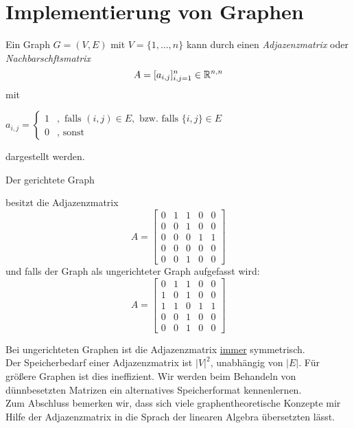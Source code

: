 \section{Implementierung von Graphen}
\begin{definition}
Ein Graph $G=(V,E)$ mit $V=\{1,\ldots,n\}$ kann durch einen \emph{Adjazenzmatrix} oder \emph{Nachbarschftsmatrix}
\[
A = [a_{i,j} ]_{i,j=1}^{n} \in  \mathbb{R}^{n,n}
\]
mit
\begin{center}
$a_{i,j} = \begin{cases}
	1 &, \text{ falls } (i,j) \in  E, \text{ bzw. falls } \{i,j\} \in E \\
	0 &, \text{ sonst}
\end{cases}$
\end{center}
dargestellt werden.
\end{definition}
\begin{example}
Der gerichtete Graph
\begin{center}
\end{center}
besitzt die Adjazenzmatrix
\[
A= \begin{bmatrix}
	0 & 1 & 1 & 0 & 0 \\
	0 & 0 & 1 & 0 & 0 \\
	0 & 0 & 0 & 1 & 1 \\
	0 & 0 & 0 & 0 & 0 \\
	0 & 0 & 1 & 0 & 0
\end{bmatrix}
\]
und falls der Graph als ungerichteter Graph aufgefasst wird:
\[
A = \begin{bmatrix}
	0&1&1&0&0\\
	1&0&1&0&0\\
	1&1&0&1&1\\
	0&0&1&0&0\\
	0&0&1&0&0
\end{bmatrix}
\]
\end{example}

\begin{remark}
Bei ungerichteten Graphen ist die Adjazenzmatrix \underline{immer} symmetrisch.\\
Der Speicherbedarf einer Adjazenzmatrix ist $|V|^2$, unabhängig von $|E|$. Für größere Graphen ist dies ineffizient. 
Wir werden beim Behandeln von dünnbesetzten Matrizen ein alternatives Speicherformat kennenlernen. \\
Zum Abschluss bemerken wir, dass sich viele graphentheoretische Konzepte mir Hilfe der Adjazenzmatrix in die Sprach der linearen Algebra übersetzten lässt.
\end{remark}
